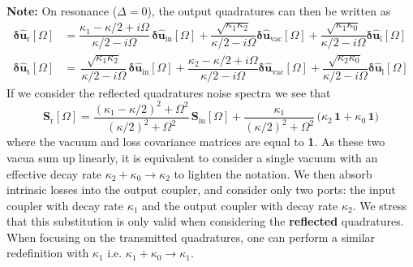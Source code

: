 \noindent \textbf{Note: } On resonance ($\Delta=0$), the output quadratures can then be written as 
\begin{equation}
  \begin{split}
  \mathbf{\delta \hat{u}_{\mathrm{r}}}[\Omega]   &= \dfrac{\kappa_1-\kappa/2+i\Omega}{\kappa/2-i\Omega}  \,  \mathbf{\delta \hat{u}_{\mathrm{in}}}[\Omega]   +   \dfrac{\sqrt{\kappa_1 \kappa_2} }{\kappa/2-i\Omega}  \mathbf{\delta \hat{u}_{\mathrm{vac}}}[\Omega] + \dfrac{\sqrt{\kappa_1 \kappa_0} }{\kappa/2-i\Omega}  \mathbf{\delta \hat{u}_{\mathrm{l}}}[\Omega]  \\
  \mathbf{\delta \hat{u}_{\mathrm{t}}}[\Omega]   &= \, \dfrac{ \sqrt{\kappa_1 \kappa_2}}{\kappa/2-i\Omega}  \, \mathbf{\delta \hat{u}_{\mathrm{in}}}[\Omega]   +  \dfrac{\kappa_2-\kappa/2+i\Omega}{\kappa/2-i\Omega}   \mathbf{\delta \hat{u}_{\mathrm{vac}}}[\Omega]   + \dfrac{\sqrt{\kappa_2 \kappa_0} }{\kappa/2-i\Omega}  \mathbf{\delta \hat{u}_{\mathrm{l}}}[\Omega] 
  \end{split}
\end{equation}
If we consider the reflected quadratures noise spectra we see that 
\begin{equation}
   \mathbf{S}_{\mathrm{r}}[\Omega] =\frac{(\kappa_1-\kappa/2)^2+\Omega^2}{(\kappa/2)^2+\Omega^2}\,\mathbf{S}_{\mathrm{in}}[\Omega]+\frac{\kappa_1}{(\kappa/2)^2+\Omega^2}\,\Big(\kappa_2 \, \mathbf{1}+\kappa_0 \,\mathbf{1}\Big) 
\end{equation}
where the vacuum and loss covariance matrices are equal to \textbf{1}. As these two vacua sum up linearly, it is equivalent to consider a single vacuum with an effective decay rate $\kappa_2 + \kappa_0 \rightarrow \kappa_2$ to lighten the notation. We then absorb intrinsic losses into the output coupler, and consider only two ports: the input coupler with decay rate $\kappa_1$ and the output coupler with decay rate $\kappa_2$. We stress that this substitution is only valid when considering the \textbf{reflected} quadratures. When focusing on the transmitted quadratures, one can perform a similar redefinition with $\kappa_1$ i.e. $\kappa_1 + \kappa_0 \rightarrow \kappa_1$. \\


